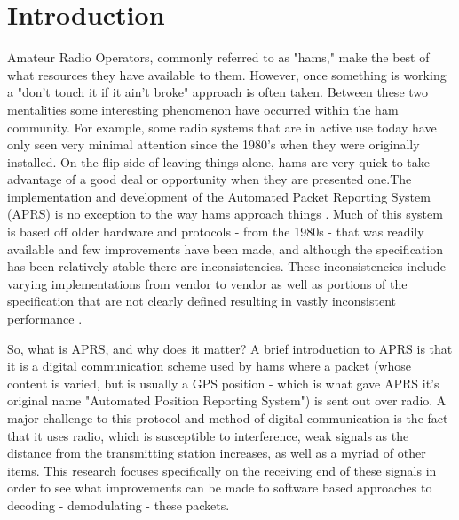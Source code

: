 \chapter{Introduction}

Amateur Radio Operators, commonly referred to as "hams," make the best of what resources they have available to them. However, once something is working a "don't touch it if it ain't broke" approach is often taken. Between these two mentalities some interesting phenomenon have occurred within the ham community. For example, some radio systems that are in active use today have only seen very minimal attention since the 1980's when they were originally installed. On the flip side of leaving things alone, hams are very quick to take advantage of a good deal or opportunity when they are presented one.The implementation and development of the Automated Packet Reporting System (APRS) is no exception to the way hams approach things \cite{Bruninga}. Much of this system is based off older hardware and protocols - from the 1980s - that was readily available and few improvements have been made, and although the specification has been relatively stable there are inconsistencies. These inconsistencies include varying implementations from vendor to vendor as well as portions of the specification that are not clearly defined resulting in vastly inconsistent performance \cite{KWFThesis, KWFTAPR}.


So, what is APRS, and why does it matter? A brief introduction to APRS is that it is a digital communication scheme used by hams where a packet (whose content is varied, but is usually a GPS position - which is what gave APRS it's original name "Automated Position Reporting System"\cite{WikiAPRS}) is sent out over radio. A major challenge to this protocol and method of digital communication is the fact that it uses radio, which is susceptible to interference, weak signals as the distance from the transmitting station increases, as well as a myriad of other items. This research focuses specifically on the receiving end of these signals in order to see what improvements can be made to software based approaches to decoding - demodulating - these packets.

